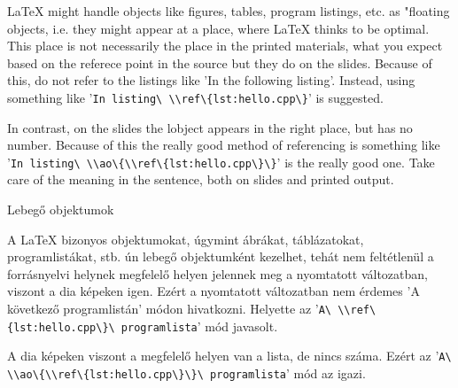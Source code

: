 
{
\LaTeX{} might handle objects like figures, tables, program listings, etc.
as "floating objects, i.e. they might appear at a place,
where \LaTeX{} thinks to be optimal.
This place is not necessarily  the place in the printed materials,
what you expect based on the referece point in the source
but they do on the slides.
Because of this, do not refer to the listings like
'In the following listing'.
Instead, using something like  '\lstinline|In listing\ \\ref\{lst:hello.cpp\}|' is suggested.

In contrast, on the slides the lobject appears in the right place,
but has no number. Because of this the really good method of referencing
is something like '\lstinline|In listing\ \\ao\{\\ref\{lst:hello.cpp\}\}|' 
is the really good one.
Take care of the meaning in the sentence, both on slides and printed output.

}
{Lebegő objektumok}
{
A \LaTeX{} bizonyos objektumokat, úgymint ábrákat, táblázatokat, programlistákat, stb. ún
lebegő objektumként kezelhet, tehát nem feltétlenül a forrásnyelvi helynek 
megfelelő helyen jelennek meg a nyomtatott változatban, viszont a dia képeken igen.
Ezért a nyomtatott változatban nem érdemes 'A következő programlistán' módon hivatkozni. Helyette
az '\lstinline|A\ \\ref\{lst:hello.cpp\}\ programlista|' mód javasolt.

A dia képeken viszont  a megfelelő helyen van a lista, de nincs száma.
Ezért az '\lstinline|A\ \\ao\{\\ref\{lst:hello.cpp\}\}\ programlista|' mód az igazi.
}